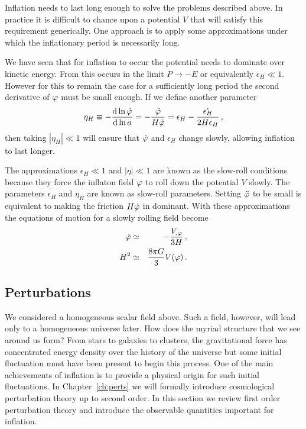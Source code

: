 Inflation needs to last long enough to solve the problems described above. In
practice it is difficult to chance upon a potential $V$ that will satisfy this
requirement generically. One approach is to apply some approximations under
which the inflationary period is necessarily long. 

We have seen that for
inflation to occur the potential needs to dominate over kinetic energy. From
 this occurs in the limit $P\rightarrow -E$ or equivalently
$\epsilon_H \ll 1$. However for this to remain the case for a sufficiently long
period the second derivative of $\varphi$ must be small enough. If we define
another parameter 
% 
\begin{equation}
 \label{eq:etaHdefn-intro}
 \eta_H \equiv -\frac{\mathrm{d} \ln \dot{\varphi}}{\mathrm{d} \ln a} =
-\frac{\ddot{\varphi}}{H\dot{\varphi}}
 =\epsilon_H -\frac{\dot{\epsilon_H}}{2H\epsilon_H}\,,
\end{equation}
% 
then taking $|\eta_H|\ll 1$ will ensure that $\dot{\varphi}$ and $\epsilon_H$
change slowly, allowing inflation to last longer.

The approximations $\epsilon_H\ll 1$ and $|\eta|\ll 1$ are known as the
slow-roll conditions because they force the inflaton field $\varphi$ to roll down
the potential $V$ slowly. The parameters $\epsilon_H$ and $\eta_H$ are known as
slow-roll parameters. Setting $\ddot{\varphi}$ to be small is equivalent to
making the friction $H\dot{\varphi}$ in  dominant. With
these approximations the
equations of motion for a slowly rolling field become
% 
\begin{eqnarray}
 \dot{\varphi} &\simeq& - \frac{V_{,\varphi}}{3H}\,, \\
 H^2 &\simeq& \frac{8\pi G}{3}V(\varphi)\,.
\end{eqnarray}




\subsection{Perturbations}
\label{sec:perts-intro}

We considered a homogeneous scalar field above. Such a field, however, will
lead only to a homogeneous universe later. How does the myriad structure
that we see around us form? From stars to galaxies to clusters, the
gravitational force has concentrated energy density over the history of the
universe but some initial fluctuation must have been present to begin this
process. One of the main achievements of inflation is to provide a physical
origin for
such initial fluctuations. In Chapter~\ref{ch:perts} we will formally introduce
cosmological perturbation theory up to second order. In this section we 
review first order perturbation theory and introduce the observable quantities
important for inflation.


